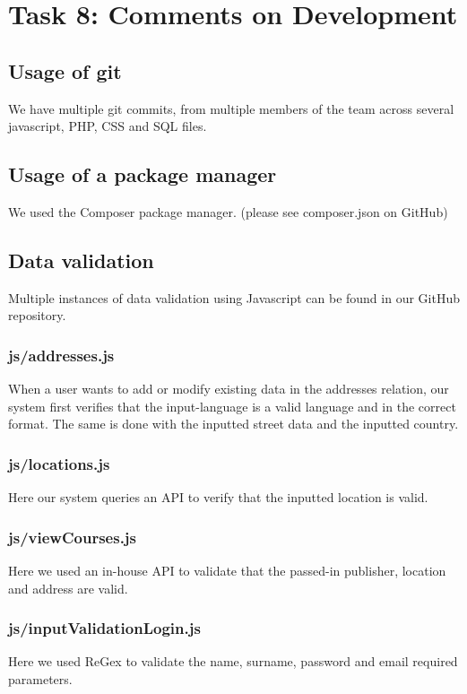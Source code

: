 \documentclass[titlepage]{article}
\begin{document}
\section{Task 8: Comments on Development}
\vspace{1em}
\subsection{Usage of git}
We have multiple git commits, from multiple members of the team across several javascript, PHP, CSS and SQL files.
\vspace{1em}
\subsection{Usage of a package manager}
We used the Composer package manager. (please see composer.json on GitHub)
\vspace{1em}
\subsection{Data validation}
Multiple instances of data validation using Javascript can be found in our GitHub repository.
\vspace{1em}
\subsubsection{js/addresses.js}
When a user wants to add or modify existing data in the addresses relation, our system first verifies that the
input-language is a valid language and in the correct format. The same is done with the inputted street data
and the inputted country.
\vspace{1em}
\subsubsection{js/locations.js}
Here our system queries an API to verify that the inputted location is valid.
\vspace{1em}
\subsubsection{js/viewCourses.js}
Here we used an in-house API to validate that the passed-in publisher, location and address are valid.
\vspace{1em}
\subsubsection{js/inputValidationLogin.js}
Here we used ReGex to validate the name, surname, password and email required parameters.
\vspace{1em}
\end{document}
